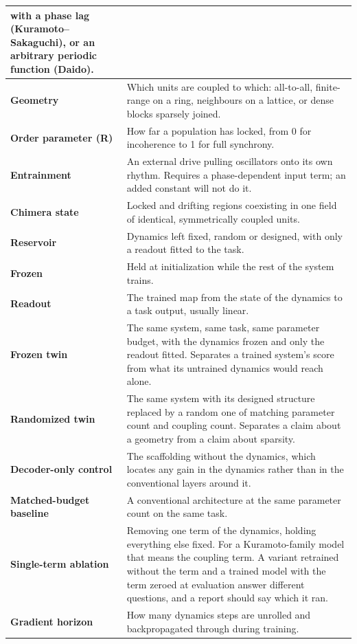 \documentclass[a4paper,fleqn]{cas-sc}
\begin{document}
\begin{longtable}[]{@{}
  >{\raggedright\arraybackslash}p{}
  >{\raggedright\arraybackslash}p{}@{}}
with a phase lag (Kuramoto--Sakaguchi), or an arbitrary periodic
function (Daido). \\
\cmidrule{1-2}\textbf{Geometry} & Which units are coupled to which:
all-to-all, finite-range on a ring, neighbours on a lattice, or dense
blocks sparsely joined. \\
\cmidrule{1-2}\textbf{Order parameter (R)} & How far a population has
locked, from 0 for incoherence to 1 for full synchrony. \\
\cmidrule{1-2}\textbf{Entrainment} & An external drive pulling
oscillators onto its own rhythm. Requires a phase-dependent input term;
an added constant will not do it. \\
\cmidrule{1-2}\textbf{Chimera state} & Locked and drifting regions
coexisting in one field of identical, symmetrically coupled units. \\
\cmidrule{1-2}\textbf{Reservoir} & Dynamics left fixed, random or
designed, with only a readout fitted to the task. \\
\cmidrule{1-2}\textbf{Frozen} & Held at initialization while the rest of
the system trains. \\
\cmidrule{1-2}\textbf{Readout} & The trained map from the state of the
dynamics to a task output, usually linear. \\
\cmidrule{1-2}\textbf{Frozen twin} & The same system, same task, same
parameter budget, with the dynamics frozen and only the readout fitted.
Separates a trained system's score from what its untrained dynamics
would reach alone. \\
\cmidrule{1-2}\textbf{Randomized twin} & The same system with its
designed structure replaced by a random one of matching parameter count
and coupling count. Separates a claim about a geometry from a claim
about sparsity. \\
\cmidrule{1-2}\textbf{Decoder-only control} & The scaffolding without
the dynamics, which locates any gain in the dynamics rather than in the
conventional layers around it. \\
\cmidrule{1-2}\textbf{Matched-budget baseline} & A conventional
architecture at the same parameter count on the same task. \\
\cmidrule{1-2}\textbf{Single-term ablation} & Removing one term of the
dynamics, holding everything else fixed. For a Kuramoto-family model
that means the coupling term. A variant retrained without the term and a
trained model with the term zeroed at evaluation answer different
questions, and a report should say which it ran. \\
\cmidrule{1-2}\textbf{Gradient horizon} & How many dynamics steps are
unrolled and backpropagated through during training. \\
\end{longtable}
\end{document}
